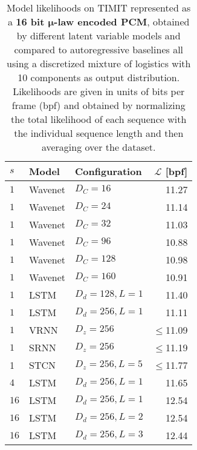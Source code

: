 {\begin{table}[p]
    \caption{
    Model likelihoods on TIMIT represented as a \textbf{16 bit $\boldsymbol{\mu}$-law encoded PCM}, obtained by different latent variable models and compared to autoregressive baselines all using a discretized mixture of logistics with 10 components as output distribution. Likelihoods are given in units of bits per frame (bpf) and obtained by normalizing the total likelihood of each sequence with the individual sequence length and then averaging over the dataset.
    }
    \centering
    \begin{tabular}{lll|r}
        \toprule
        $s$    & \bf Model           & \bf Configuration           & \bf $\mathcal{L}$ [bpf] \\
        \midrule
        $1$       & Wavenet             & $D_C=16$              & 11.27 \\
        $1$       & Wavenet             & $D_C=24$              & 11.14 \\
        $1$       & Wavenet             & $D_C=32$              & 11.03 \\
        $1$       & Wavenet             & $D_C=96$              & 10.88 \\
        $1$       & Wavenet             & $D_C=128$             & 10.98 \\
        $1$       & Wavenet             & $D_C=160$             & 10.91 \\
        $1$       & LSTM                & $D_d=128, L=1$        & 11.40 \\
        $1$       & LSTM                & $D_d=256, L=1$        & 11.11 \\
        $1$       & VRNN                & $D_z=256$             & $\leq$11.09 \\
        $1$       & SRNN                & $D_z=256$             & $\leq$11.19 \\
        1 & STCN                & $D_z=256,L=5$               & $\leq$11.77 \\  %
        \midrule
        $4$       & LSTM                & $D_d=256, L=1$        & 11.65 \\
        \midrule
        $16$      & LSTM                & $D_d=256, L=1$        & 12.54 \\
        $16$      & LSTM                & $D_d=256, L=2$        & 12.54 \\
        $16$      & LSTM                & $D_d=256, L=3$        & 12.44 \\
        \midrule

\end{tabular}
\end{table}}
